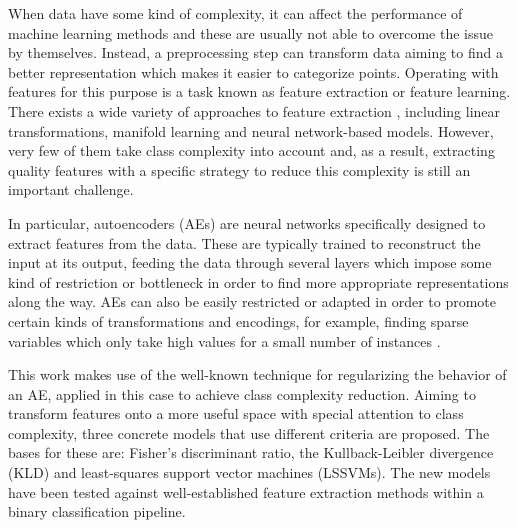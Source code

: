 \documentclass[
	fontsize=11pt, %
	twoside=false, %
	open=any, %
	secnumdepth=1, %
]{kaobook}
\newcommand{\change}[1]{{\color{blue}#1}}
\renewcommand{\change}[1]{#1}
\newcommand{\rechange}[1]{{\color{blue}#1}}
\renewcommand{\rechange}[1]{#1}
\begin{document}
When data have some kind of complexity, it can affect the performance of machine learning methods and these are usually not able to overcome the issue by themselves. Instead, \rechange{a preprocessing step can transform data aiming to find} a better representation which makes it easier to categorize points. Operating with features for this purpose is a task known as feature extraction or feature learning. There exists a wide variety of approaches to feature extraction \cite{bengio2013representation}, including linear transformations, manifold learning and neural network-based models. However, very few of them take class complexity into account and, as a result, extracting quality features with a specific strategy to reduce this complexity is still an important challenge.

In particular, autoencoders (AEs) \cite{charte-tutorial} are neural networks specifically designed to extract features from the data. These are typically trained to reconstruct the input at its output, feeding the data through several layers which impose some kind of restriction or bottleneck in order to find more appropriate representations along the way. AEs can also be easily restricted or adapted in order to promote certain kinds of transformations and encodings, for example, finding sparse variables which only take high values for a small number of instances \cite{ng2011sparse}.

\change{This work makes use of the well-known technique for regularizing the behavior of an AE, applied in this case to achieve class complexity reduction. Aiming to transform features onto a more useful space with special attention to class complexity, three concrete models that use different criteria are proposed. The bases for these are}: Fisher's discriminant ratio, the Kullback-Leibler divergence (KLD) and least-squares support vector machines (LSSVMs). The new models have been tested against well-established feature extraction methods \rechange{within a binary classification pipeline}.
\end{document}
